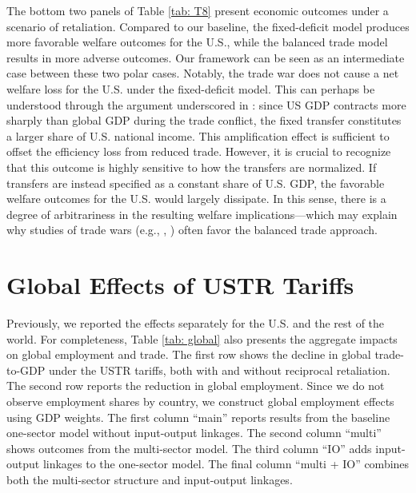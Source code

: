 \documentclass[12pt]{article}
\begin{document}
The bottom two panels of Table \ref{tab: T8} present economic outcomes under a scenario of retaliation. Compared to our baseline, the fixed-deficit model produces more favorable welfare outcomes for the U.S., while the balanced trade model results in more adverse outcomes. Our framework can be seen as an intermediate case between these two polar cases. Notably, the trade war does not cause a net welfare loss for the U.S. under the fixed-deficit model. This can perhaps be understood through the argument underscored in \cite{Ossa}: since US GDP contracts more sharply than global GDP during the trade conflict, the fixed transfer constitutes a larger share of U.S. national income. This amplification effect is sufficient to offset the efficiency loss from reduced trade. However, it is crucial to recognize that this outcome is highly sensitive to how the transfers are normalized. If transfers are instead specified as a constant share of U.S. GDP, the favorable welfare outcomes for the U.S. would largely dissipate. In this sense, there is a degree of arbitrariness in the resulting welfare implications---which may explain why studies of trade wars (e.g., \cite{Ossa}, \cite{Lashkaripour_tariff_war}) often favor the balanced trade approach.


\section{Global Effects of USTR Tariffs}
Previously, we reported the effects separately for the U.S. and the rest of the world. For completeness, Table \ref{tab: global} also presents the aggregate impacts on global employment and trade. The first row shows the decline in global trade-to-GDP under the USTR tariffs, both with and without reciprocal retaliation. The second row reports the reduction in global employment. Since we do not observe employment shares by country, we construct global employment effects using GDP weights. The first column ``main'' reports results from the baseline one-sector model without input-output linkages. The second column ``multi'' shows outcomes from the multi-sector model. The third column ``IO'' adds input-output linkages to the one-sector model. The final column ``multi + IO'' combines both the multi-sector structure and input-output linkages.
\end{document}
